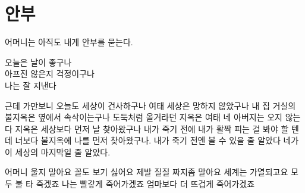 \hypertarget{uxc548uxbd80}{%

\chapter{안부}\label{uxc548uxbd80}}



어머니는 아직도 내게 안부를 묻는다.



오늘은 날이 좋구나\\

아프진 않은지 걱정이구나\\

나는 잘 지낸다



근데 가만보니 오늘도 세상이 건사하구나 여태 세상은 망하지 않았구나 내 집 거실의 불지옥은 옆에서 속삭이는구나 도둑처럼 올거라던 지옥은 여태 네 아버지는 오지 않는다 지옥은 세상보다 먼저 날 찾아왔구나 내가 죽기 전에 내가 활짝 피는 걸 봐야 할 텐데 너보다 불지옥에 나를 먼저 찾아왔구나. 내가 죽기 전엔 볼 수 있을 줄 알았다 네가 이 세상의 마지막일 줄 알았다.



어머니 울지 말아요 꼴도 보기 싫어요 제발 질질 짜지좀 말아요 세계는 가열되고요 모두 불 타 죽겠죠 나는 빨갛게 죽어가겠죠 엄마보다 더 뜨겁게 죽어가겠죠 ​

